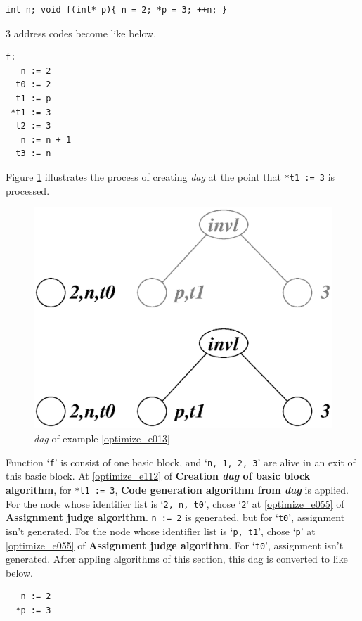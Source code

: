 \begin{Example}
\label{optimize_e013}
\begin{verbatim}
int n; void f(int* p){ n = 2; *p = 3; ++n; }
\end{verbatim}
3 address codes become like below.
\begin{verbatim}
f:
   n := 2
  t0 := 2
  t1 := p
 *t1 := 3
  t2 := 3
   n := n + 1
  t3 := n
\end{verbatim}
Figure \ref{optimize_e014} illustrates the process of creating
{\em dag} at the point that {\tt{*t1 := 3}} is processed.
\begin{figure}[htbp]
\begin{center}
\includegraphics[width=1.0\linewidth,height=0.729\linewidth]{opt004.eps}
\caption{{\em dag} of example \ref{optimize_e013}}
\label{optimize_e014}
\end{center}
\end{figure}

Function `{\tt{f}}' is consist of one basic block, and 
`{\tt{n, 1, 2, 3}}' are alive in an exit of this basic block.
At \ref{optimize_e112} of {\bf Creation {\em dag} of basic block algorithm},
for {\tt{*t1 := 3}},
{\bf Code generation algorithm from {\em dag}} is applied.
For the node whose identifier list is `{\tt{2, n, t0}}',
chose `{\tt{2}}'
at \ref{optimize_e055} of {\bf Assignment judge algorithm}.
{\tt{n := 2}} is generated, but for `{\tt{t0}}', 
assignment isn't generated.
For the node whose identifier list is `{\tt{p, t1}}',
chose `{\tt{p}}'
at \ref{optimize_e055} of {\bf Assignment judge algorithm}.
For `{\tt{t0}}', 
assignment isn't generated. 
After appling algorithms of this section,
this dag is converted to like below.
\begin{verbatim}
   n := 2
  *p := 3
\end{verbatim}
\end{Example}

